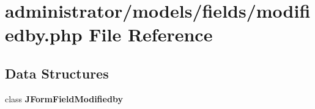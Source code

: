 \section{administrator/models/fields/modifiedby.php File Reference}
\label{administrator_2models_2fields_2modifiedby_8php}
\subsection*{Data Structures}
\begin{DoxyCompactItemize}
\item 
class \textbf{ J\+Form\+Field\+Modifiedby}
\end{DoxyCompactItemize}
